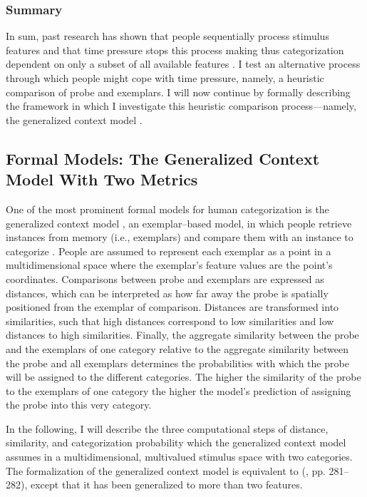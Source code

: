 \documentclass[a4paper,man,natbib]{apa6}
\begin{document}
\subsubsection{Summary}
In sum, past research has shown that people sequentially process stimulus features and that time pressure stops this process making thus categorization dependent on only a subset of all available features \citep{lamberts1995categorization, lamberts1998time, lamberts1999building, lamberts1999categorization, lamberts1997fast}. I test an alternative process through which people might cope with time pressure, namely, a heuristic comparison of probe and exemplars. I will now continue by formally describing the framework in which I investigate this heuristic comparison process---namely, the generalized context model \citep{nosofsky1986attention}.

\subsection{Formal Models: The Generalized Context Model With Two Metrics}
One of the most prominent formal models for human categorization is the generalized context model \citep{nosofsky1984choice, nosofsky1986attention, nosofsky2011generalized}, an exemplar--based model, in which people retrieve instances from memory (i.e., exemplars) and compare them with an instance to categorize \citep[i.e., the probe; see also][]{medin1978context}. People are assumed to represent each exemplar as a point in a multidimensional space where the exemplar's feature values are the point's coordinates. Comparisons between probe and exemplars are expressed as distances, which can be interpreted as how far away the probe is spatially positioned from the exemplar of comparison. Distances are transformed into similarities, such that high distances correspond to low similarities and low distances to high similarities. Finally, the aggregate similarity between the probe and the exemplars of one category relative to the aggregate similarity between the probe and all exemplars determines the probabilities with which the probe will be assigned to the different categories. The higher the similarity of the probe to the exemplars of one category the higher the model's prediction of assigning the probe into this very category. 

In the following, I will describe the three computational steps of distance, similarity, and categorization probability which the generalized context model assumes in a multidimensional, multivalued stimulus space with two categories. The formalization of the generalized context model is equivalent to \citeauthor{nosofsky1989further} (\citeyear{nosofsky1989further}, pp. 281--282), except that it has been generalized to more than two features. 
\end{document}
